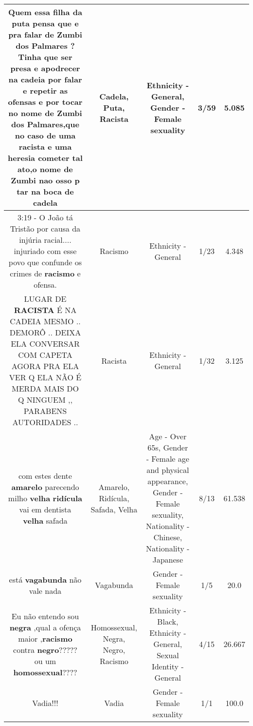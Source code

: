 \documentclass[11pt]{article}
\newlength\mylength
\begin{document}
\begin{center}
\begin{longtable}{|C{.65\mylength}|C{.30\mylength}|C{.12\mylength}|C{.12\mylength}|C{.12\mylength}|}
  \small Quem essa filha da \textbf{puta} pensa que e pra falar de Zumbi dos Palmares ?Tinha que ser presa e apodrecer na cadeia por falar e repetir as ofensas e por tocar no nome de Zumbi dos Palmares,que no caso de uma \textbf{racista} e uma heresia cometer tal ato,o nome de Zumbi nao osso p tar na boca de cadela\normalsize   & Cadela, Puta, Racista & Ethnicity - General, Gender - Female sexuality & 3/59 & 5.085 \\  \hline
  \small 3:19 - O João tá Tristão por causa da injúria racial.... injuriado com esse povo que confunde os crimes de \textbf{racismo} e ofensa.\normalsize   & Racismo & Ethnicity - General & 1/23 & 4.348 \\  \hline
  \small LUGAR  DE  \textbf{RACISTA}  É  NA  CADEIA  MESMO  ..  DEMORÔ  ..  DEIXA ELA   CONVERSAR  COM  CAPETA  AGORA  PRA  ELA  VER Q  ELA  NÃO É  MERDA  MAIS DO Q NINGUEM  ,, PARABENS  AUTORIDADES ..\normalsize   & Racista & Ethnicity - General & 1/32 & 3.125 \\  \hline
  \small com estes dente \textbf{a\textbf{marelo}} parecendo milho \textbf{v\textbf{elha}} \textbf{ridícula} vai em dentista \textbf{v\textbf{elha}} safada\normalsize   & Amarelo, Ridícula, Safada, Velha & Age - Over 65s, Gender - Female age and physical appearance, Gender - Female sexuality, Nationality - Chinese, Nationality - Japanese & 8/13 & 61.538 \\  \hline
  \small está \textbf{vagabunda} não vale nada\normalsize   & Vagabunda & Gender - Female sexuality & 1/5 & 20.0 \\  \hline
  \small Eu não entendo sou \textbf{negra} ,qual a ofença maior ,\textbf{racismo} contra \textbf{negro}????? ou um \textbf{homossexual}????\normalsize   & Homossexual, Negra, Negro, Racismo & Ethnicity - Black, Ethnicity - General, Sexual Identity - General & 4/15 & 26.667 \\  \hline
  \small Vadia!!!\normalsize   & Vadia & Gender - Female sexuality & 1/1 & 100.0 \\  \hline

\end{longtable}
\end{center}
\end{document}
